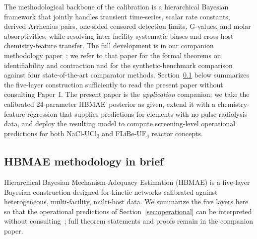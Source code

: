 \documentclass[11pt]{article}
\theoremstyle{plain}
\theoremstyle{definition}
\theoremstyle{remark}
\newcommand{\HBMAE}{HBMAE\xspace}
\begin{document}
The methodological backbone of the calibration is a hierarchical Bayesian
framework that jointly handles transient time-series, scalar rate constants,
derived Arrhenius pairs, one-sided censored detection limits, G-values, and
molar absorptivities, while resolving inter-facility systematic biases and
cross-host chemistry-feature transfer.  The full development is in our
companion methodology paper~\citep{Tanore2026PaperI}; we refer to that paper
for the formal theorems on identifiability and contraction and for the
synthetic-benchmark comparison against four state-of-the-art comparator
methods.  Section~\ref{sec:hbmae-brief} below summarizes the five-layer
construction sufficiently to read the present paper without consulting
Paper~I.  The present paper is the \emph{application} companion: we take
the calibrated 24-parameter \HBMAE\ posterior as given, extend it with a
chemistry-feature regression that supplies predictions for elements with
no pulse-radiolysis data, and deploy the resulting model to compute
screening-level operational predictions for both NaCl-UCl\textsubscript{3}
and FLiBe-UF\textsubscript{4} reactor concepts.

\subsection{HBMAE methodology in brief}\label{sec:hbmae-brief}

Hierarchical Bayesian Mechanism-Adequacy Estimation (\HBMAE) is a five-layer
Bayesian construction designed for kinetic networks calibrated against
heterogeneous, multi-facility, multi-host data.  We summarize the five
layers here so that the operational predictions of
Section~\ref{sec:operational} can be interpreted without
consulting~\citet{Tanore2026PaperI}; full theorem statements and proofs
remain in the companion paper.
\end{document}
